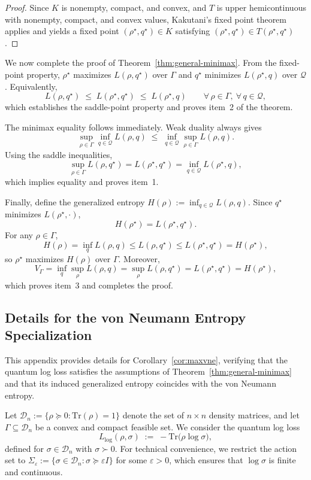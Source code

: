 \documentclass{article}
\theoremstyle{plain}
\theoremstyle{definition}
\begin{document}
\begin{appendices}
\begin{proof}
Since $K$ is nonempty, compact, and convex, and $T$ is upper hemicontinuous with
nonempty, compact, and convex values, Kakutani’s fixed point theorem applies and
yields a fixed point $(\rho^\star,q^\star)\in K$ satisfying
$(\rho^\star,q^\star)\in T(\rho^\star,q^\star)$.
\end{proof}

We now complete the proof of Theorem~\ref{thm:general-minimax}.
From the fixed-point property,
$\rho^\star$ maximizes $L(\rho,q^\star)$ over $\Gamma$ and
$q^\star$ minimizes $L(\rho^\star,q)$ over $\mathcal{Q}$.
Equivalently,
\[
L(\rho,q^\star)
\;\le\;
L(\rho^\star,q^\star)
\;\le\;
L(\rho^\star,q)
\qquad
\forall\,\rho\in\Gamma,\ \forall\,q\in\mathcal{Q},
\]
which establishes the saddle-point property and proves item~2 of the theorem.

The minimax equality follows immediately.
Weak duality always gives
\[
\sup_{\rho\in\Gamma}\inf_{q\in\mathcal{Q}} L(\rho,q)
\;\le\;
\inf_{q\in\mathcal{Q}}\sup_{\rho\in\Gamma} L(\rho,q).
\]
Using the saddle inequalities,
\[
\sup_{\rho\in\Gamma} L(\rho,q^\star)
=
L(\rho^\star,q^\star)
=
\inf_{q\in\mathcal{Q}} L(\rho^\star,q),
\]
which implies equality and proves item~1.

Finally, define the generalized entropy
$H(\rho):=\inf_{q\in\mathcal{Q}} L(\rho,q)$.
Since $q^\star$ minimizes $L(\rho^\star,\cdot)$,
\[
H(\rho^\star)=L(\rho^\star,q^\star).
\]
For any $\rho\in\Gamma$,
\[
H(\rho)
=
\inf_{q}L(\rho,q)
\le
L(\rho,q^\star)
\le
L(\rho^\star,q^\star)
=
H(\rho^\star),
\]
so $\rho^\star$ maximizes $H(\rho)$ over $\Gamma$.
Moreover,
\[
V_\Gamma
=
\inf_{q}\sup_{\rho}L(\rho,q)
=
\sup_{\rho}L(\rho,q^\star)
=
L(\rho^\star,q^\star)
=
H(\rho^\star),
\]
which proves item~3 and completes the proof.


\subsection{Details for the von Neumann Entropy Specialization}
\label{app:vne}

This appendix provides details for Corollary~\ref{cor:maxvne}, verifying that the
quantum log loss satisfies the assumptions of Theorem~\ref{thm:general-minimax}
and that its induced generalized entropy coincides with the von Neumann entropy.

Let $\mathcal{D}_n:=\{\rho\succeq 0:\mathrm{Tr}(\rho)=1\}$ denote the set of
$n\times n$ density matrices, and let $\Gamma\subseteq\mathcal{D}_n$ be a convex
and compact feasible set. We consider the quantum log loss
\[
L_{\log}(\rho,\sigma)
\;:=\;
-\mathrm{Tr}\bigl(\rho\log\sigma\bigr),
\]
defined for $\sigma\in\mathcal{D}_n$ with $\sigma\succ 0$. For technical convenience,
we restrict the action set to
$\Sigma_\varepsilon:=\{\sigma\in\mathcal{D}_n:\sigma\succeq \varepsilon I\}$ for some
$\varepsilon>0$, which ensures that $\log\sigma$ is finite and continuous.


\end{appendices}
\end{document}
